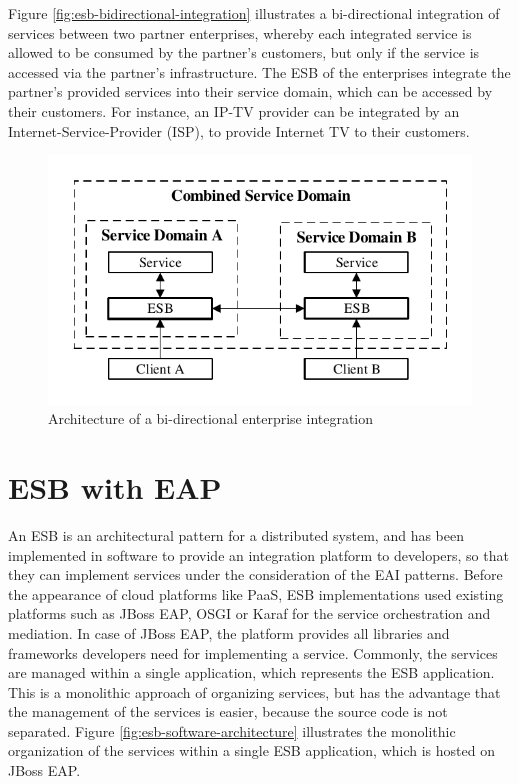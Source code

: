 Figure \vref{fig:esb-bidirectional-integration} illustrates a bi-directional integration of services between two partner enterprises, whereby each integrated service is allowed to be consumed by the partner's customers, but only if the service is accessed via the partner's infrastructure. The ESB of the enterprises integrate the partner's provided services into their service domain, which can be accessed by their customers. For instance, an IP-TV provider can be integrated by an Internet-Service-Provider (ISP), to provide Internet TV to their customers. 

\begin{figure}[htbp]
	\centering
	\includegraphics[scale=1]{images/esb-bidirectional-integration.pdf}
	\caption{Architecture of a bi-directional enterprise integration}
	\label{fig:esb-bidirectional-integration}
\end{figure} 

\section{ESB with EAP}
\label{sec:esb-as-software}
An ESB is an architectural pattern for a distributed system, and has been implemented in software to provide an integration platform to developers, so that they can implement services under the consideration of the EAI patterns. Before the appearance of cloud platforms like PaaS, ESB implementations used existing platforms such as JBoss EAP, OSGI or Karaf for the service orchestration and mediation. In case of JBoss EAP, the platform provides all libraries and frameworks developers need for implementing a service. Commonly, the services are managed within a single application, which represents the ESB application. This is a monolithic approach of organizing services, but has the advantage that the management of the services is easier, because the source code is not separated. Figure \vref{fig:esb-software-architecture} illustrates the monolithic organization of the services within a single ESB application, which is hosted on JBoss EAP.

